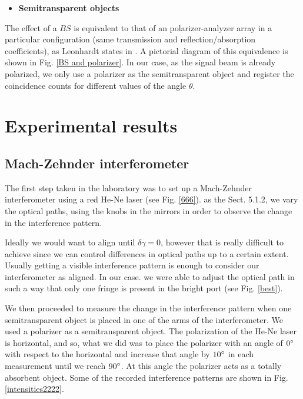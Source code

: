 \documentclass[12pt]{book}
\begin{document}
 \begin{itemize}
\item {\large \textbf{Semitransparent objects}}
\end{itemize}

The effect of a $BS$ is equivalent to that of an polarizer-analyzer array in a particular configuration (same transmission and reflection/absorption coefficients), as Leonhardt states in \cite{nosirve}. A pictorial diagram of this equivalence is shown in Fig. \ref{BS and polarizer}. In our case, as the signal beam is already polarized, we only use a polarizer as the semitransparent object and register the coincidence counts for different values of the angle $\theta$.







  
 \pagebreak
 

\chapter{Experimental results}

\section{Mach-Zehnder interferometer}

The first step taken in the laboratory was to set up a Mach-Zehnder interferometer using a red He-Ne laser (see Fig. \ref{666}). as the Sect. 5.1.2, we vary the optical paths, using the knobs in the mirrors in order to observe the change in the interference pattern.



Ideally we would want to align until $\delta \gamma=0$, however that is really difficult to achieve since we can control differences in optical paths up to a certain extent. Usually getting a visible interference pattern is enough to consider our interferometer as aligned. In our case. we were able to adjust the optical path in such a way that only one fringe is present in the bright port (see Fig. \ref{best}).

We then proceeded to measure the change in the interference pattern when one semitransparent object is placed in one of the arms of the interferometer. We used a polarizer as a semitransparent object. The polarization of the He-Ne laser is horizontal, and so, what we did was to place the polarizer with an angle of $0\degree$ with respect to the horizontal and increase that angle by $10\degree$ in each measurement until we reach $90\degree$. At this angle the polarizer acts as a totally absorbent object. Some of the recorded interference patterns are shown in Fig. \ref{intensities2222}. 
\end{document}
